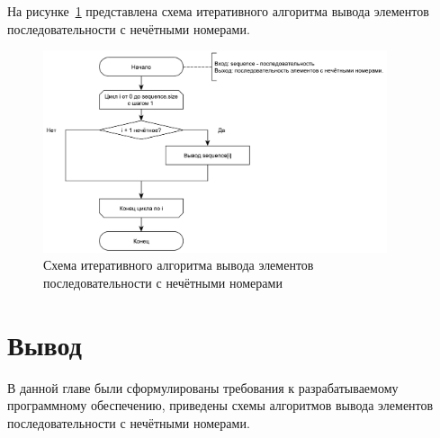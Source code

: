 На рисунке~\ref{iteration} представлена схема итеративного алгоритма вывода элементов последовательности с нечётными номерами.

\begin{figure}[h!]
	\centering
	\includegraphics[width=0.9\textwidth, height=0.9\textheight, keepaspectratio]{images/iteration}
	\caption{Схема итеративного алгоритма вывода элементов последовательности с нечётными номерами}
	\label{iteration}
\end{figure}

\section*{Вывод}

В данной главе были сформулированы требования к разрабатываемому программному обеспечению, приведены схемы алгоритмов вывода элементов последовательности с нечётными номерами.  

